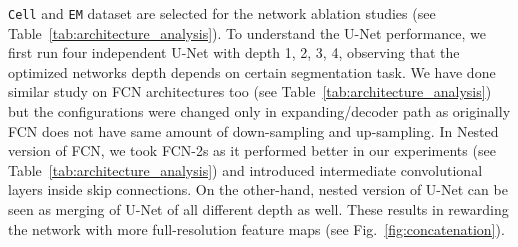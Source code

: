 \documentclass[runningheads]{llncs}
\begin{document}
\texttt{Cell} and \texttt{EM} dataset are selected for the network ablation studies (see Table~\ref{tab:architecture_analysis}). To understand the U-Net performance, we first run four independent U-Net with depth 1, 2, 3, 4, observing that the optimized networks depth depends on certain segmentation task. We have done similar study on FCN architectures too (see Table~\ref{tab:architecture_analysis}) but the configurations were changed only in expanding/decoder path as originally FCN does not have same amount of down-sampling and up-sampling. In Nested version of FCN, we took FCN-2s as it performed better in our experiments (see Table~\ref{tab:architecture_analysis}) and introduced intermediate convolutional layers inside skip connections. On the other-hand, nested version of U-Net can be seen as merging of U-Net of all different depth as well. These results in rewarding the network with more full-resolution feature maps (see Fig.~\ref{fig:concatenation}).
\end{document}
